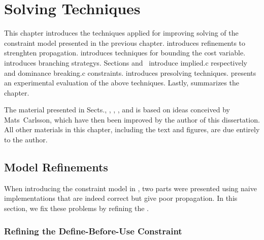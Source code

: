 %

\chapter{Solving Techniques}

This chapter introduces the techniques applied for improving solving of the
\gls{constraint model} presented in the previous chapter.
%
 introduces 
refinements to strenghten \gls{propagation}.
%
 introduces techniques for bounding the \gls{cost
  variable}.
%
 introduces \glspl{branching strategy}.
%
Sections\thinspace{}
and~ introduce \gls{implied.c} respectively
 and \gls{dominance breaking.c}
\glspl{constraint}.
%
 introduces \gls{presolving} techniques.
%
 presents an experimental evaluation of
the above techniques.
%
Lastly,  summarizes the chapter.

The material presented in Sects.\thinspace{},
, ,
, and 
is based on ideas conceived by Mats~Carlsson, which have then been improved by
the author of this dissertation.
%
All other materials in this chapter, including the text and figures, are due
entirely to the author.


\section{Model Refinements}

When introducing the \gls{constraint model} in ,
two parts were presented using naive implementations that are indeed correct but
give poor \gls{propagation}.
%
In this section, we fix these problems by refining the .


\subsection{Refining the Define-Before-Use Constraint}

